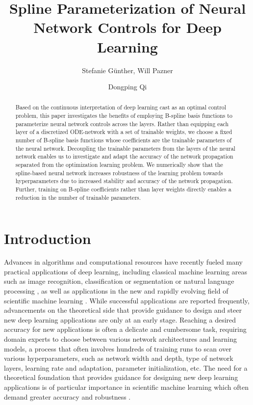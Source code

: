 \documentclass[12pt]{amsart}
\title{Spline Parameterization of Neural Network Controls for Deep Learning}
\author{Stefanie G{\"u}nther, Will Pazner}
\author{Dongping Qi}
\begin{document}
\maketitle

\begin{abstract}
Based on the continuous interpretation of deep learning cast as an optimal control problem, this paper investigates the benefits of employing B-spline basis functions to parameterize neural network controls across the layers. Rather than equipping each layer of a discretized ODE-network with a set of trainable weights, we choose a fixed number of B-spline basis functions whose coefficients are the trainable parameters of the neural network. Decoupling the trainable parameters from the layers of the neural network enables us to investigate and adapt the accuracy of the network propagation separated from the optimization learning problem. We numerically show that the spline-based neural network increases robustness of the learning problem towards hyperparameters due to increased stability and accuracy of the network propagation. Further, training on B-spline coefficients rather than layer weights directly enables a reduction in the number of trainable parameters.

\end{abstract}

\section{Introduction}

Advances in algorithms and computational resources have recently fueled many practical applications of deep learning, including classical machine learning areas such as image recognition, classification or segmentation \cite{he2016deep, ronneberger2015u} or natural language processing \cite{goldberg2017neural}, as well as applications in the new and rapidly evolving field of scientific machine learning \cite{rackauckas2020universal, HornungEtAl2020, HeyEtAl2020, spears2018deep, roscher2020explainable}.
While successful applications are reported frequently, advancements on the theoretical side that provide guidance to design and steer new deep learning applications are only at an early stage.
Reaching a desired accuracy for new applications is often a delicate and cumbersome task, requiring domain experts to choose between various network architectures and learning models, a process that often involves hundreds of training runs to scan over various hyperparameters, such as network width and depth, type of network layers, learning rate and adaptation, parameter initialization, etc.
The need for a theoretical foundation that provides guidance for designing new deep learning applications is of particular importance in scientific machine learning which often demand greater accuracy and robustness \cite{raissi2019physics}.
\end{document}
